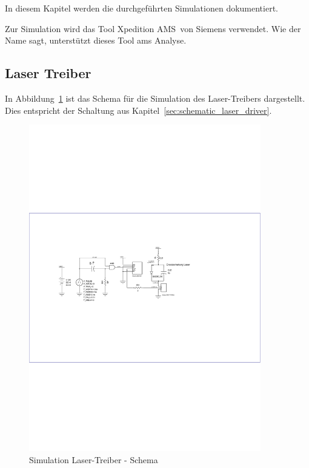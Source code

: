 In diesem Kapitel werden die durchgeführten Simulationen dokumentiert.

Zur Simulation wird das Tool \dq Xpedition AMS\dq\ von Siemens verwendet. Wie der Name sagt, unterstützt dieses Tool
\acrfull{ams} Analyse. \cite{siemens2025xpeditionams}

\subsection{Laser Treiber}

In Abbildung~\ref{fig:simulation_laser_driver_schematic} ist das Schema für die Simulation des Laser-Treibers
dargestellt. Dies entspricht der Schaltung aus Kapitel~\ref{sec:schematic_laser_driver}.

\begin{figure}[H]
    \centering
    \includegraphics[trim=70 380 180 310, clip, width=0.9\textwidth]{attachments/simulation_laser_driver_schematic.pdf}
    \caption{Simulation Laser-Treiber - Schema}\label{fig:simulation_laser_driver_schematic}
\end{figure}

